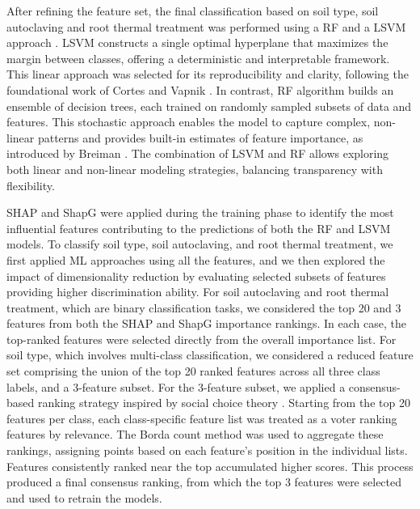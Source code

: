 \documentclass[12pt]{article}
\theoremstyle{thmstyleone}%
\theoremstyle{thmstyletwo}%
\theoremstyle{thmstylethree}%
\begin{document}
After refining the feature set, the final classification based on soil type, soil autoclaving and root thermal treatment was performed using a RF \citep{RandomForest, pedregosa2011scikit} and a LSVM approach \citep{SVM}. LSVM constructs a single optimal hyperplane that maximizes the margin between classes, offering a deterministic and interpretable framework. This linear approach was selected for its reproducibility and clarity, following the foundational work of Cortes and Vapnik \citep{SVM}. In contrast, RF algorithm builds an ensemble of decision trees, each trained on randomly sampled subsets of data and features. This stochastic approach enables the model to capture complex, non-linear patterns and provides built-in estimates of feature importance, as introduced by Breiman \citep{RandomForest}. The combination of LSVM and RF allows exploring both linear and non-linear modeling strategies, balancing transparency with flexibility.

SHAP \citep{SHAP} and ShapG \citep{shapG} were applied during the training phase to identify the most influential features contributing to the predictions of both the RF and LSVM models. To classify soil type, soil autoclaving, and root thermal treatment, we first applied ML approaches using all the features, and we then explored the impact of  dimensionality reduction by evaluating selected subsets of features providing higher discrimination ability. For soil autoclaving and root thermal treatment, which are binary classification tasks, we considered the top 20 and 3 features from both the SHAP and ShapG importance rankings. In each case, the top-ranked features were selected directly from the overall importance list. For soil type, which involves multi-class classification, we considered a reduced feature set comprising the union of the top 20 ranked features across all three class labels, and a 3-feature subset. For the 3-feature subset, we applied a consensus-based ranking strategy inspired by social choice theory \citep{atzori2010internet, Nassiri_Mofakham, esmaeili}. Starting from the top 20 features per class, each class-specific feature list was treated as a voter ranking features by relevance. The Borda count method was used to aggregate these rankings, assigning points based on each feature’s position in the individual lists. Features consistently ranked near the top accumulated higher scores. This process produced a final consensus ranking, from which the top 3 features were selected and used to retrain the models.
\end{document}
